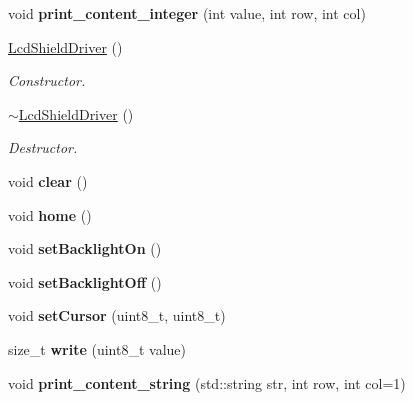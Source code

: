 \begin{DoxyCompactItemize}
void {\bfseries print\+\_\+content\+\_\+integer} (int value, int row, int col)
\item 
\mbox{\label{classLcdShieldDriver_a14d2027ac041be273d6b894a6d66bb1f}} 
\hyperlink{classLcdShieldDriver_a14d2027ac041be273d6b894a6d66bb1f}{Lcd\+Shield\+Driver} ()
\begin{DoxyCompactList}\small\item\em Constructor. \end{DoxyCompactList}\item 
\mbox{\label{classLcdShieldDriver_aaec080d1c36326c1e58642a7e28d85b1}} 
\hyperlink{classLcdShieldDriver_aaec080d1c36326c1e58642a7e28d85b1}{$\sim$\+Lcd\+Shield\+Driver} ()
\begin{DoxyCompactList}\small\item\em Destructor. \end{DoxyCompactList}\item 
\mbox{\label{classLcdShieldDriver_a43e151fc827a4d8d982bc2857b78262e}} 
void {\bfseries clear} ()
\item 
\mbox{\label{classLcdShieldDriver_a7bccc296eef476eb49984bdf8fdebb14}} 
void {\bfseries home} ()
\item 
\mbox{\label{classLcdShieldDriver_a68a86a7407fd3df5714f3351d657e499}} 
void {\bfseries set\+Backlight\+On} ()
\item 
\mbox{\label{classLcdShieldDriver_a81639e7553501343137be8984d7ea7d9}} 
void {\bfseries set\+Backlight\+Off} ()
\item 
\mbox{\label{classLcdShieldDriver_a6733a16dc0e1d58cfdfb4019ea2e6582}} 
void {\bfseries set\+Cursor} (uint8\+\_\+t, uint8\+\_\+t)
\item 
\mbox{\label{classLcdShieldDriver_aea03f93f7dfad9bc185bd77ef059c665}} 
size\+\_\+t {\bfseries write} (uint8\+\_\+t value)
\item 
\mbox{\label{classLcdShieldDriver_a893f217db662b34726d0684bb014f7d4}} 
void {\bfseries print\+\_\+content\+\_\+string} (std\+::string str, int row, int col=1)

\end{DoxyCompactItemize}
